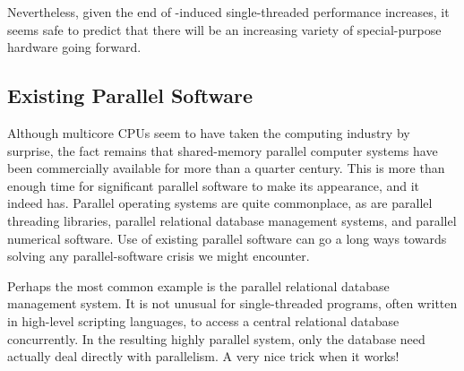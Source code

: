 Nevertheless, given the end of -induced
single-threaded
performance increases, it seems safe to predict that there will
be an increasing variety of special-purpose hardware going forward.

\subsection{Existing Parallel Software}
\label{sec:cpu:Existing Parallel Software}

Although multicore CPUs seem to have taken the computing industry
by surprise, the fact remains that shared-memory parallel computer
systems have been commercially available for more than a quarter
century.
This is more than enough time for significant parallel software
to make its appearance, and it indeed has.
Parallel operating systems are quite commonplace, as are parallel
threading libraries, parallel relational database management systems, 
and parallel numerical software.
Use of existing parallel software can go a long ways towards solving any
parallel-software crisis we might encounter.

Perhaps the most common example is the parallel relational database
management system.
It is not unusual for single-threaded programs, often written in
high-level scripting languages, to access a central relational
database concurrently.
In the resulting highly parallel system, only the database need actually
deal directly with parallelism.
A very nice trick when it works!
